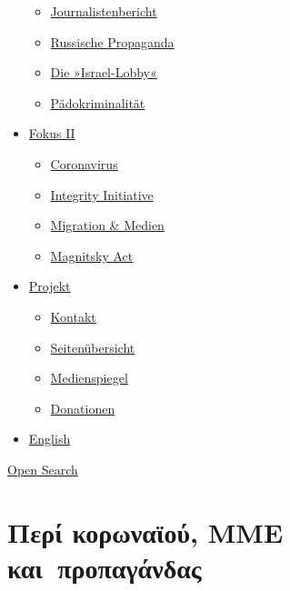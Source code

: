\begin{itemize}
  \begin{itemize}
  \tightlist
  \item
    \href{https://swprs.org/bericht-eines-journalisten/}{Journalistenbericht}
  \item
    \href{https://swprs.org/russische-propaganda/}{Russische Propaganda}
  \item
    \href{https://swprs.org/die-israel-lobby-fakten-und-mythen/}{Die
    »Israel-Lobby«}
  \item
    \href{https://swprs.org/geopolitik-und-paedokriminalitaet/}{Pädokriminalität}
  \end{itemize}
\item
  \href{https://swprs.org/migration-und-medien/}{Fokus II}

  \begin{itemize}
  \tightlist
  \item
    \href{https://swprs.org/covid-19-hinweis-ii/}{Coronavirus}
  \item
    \href{https://swprs.org/die-integrity-initiative/}{Integrity
    Initiative}
  \item
    \href{https://swprs.org/migration-und-medien/}{Migration \& Medien}
  \item
    \href{https://swprs.org/der-fall-magnitsky/}{Magnitsky Act}
  \end{itemize}
\item
  \href{https://swprs.org/kontakt/}{Projekt}

  \begin{itemize}
  \tightlist
  \item
    \href{https://swprs.org/kontakt/}{Kontakt}
  \item
    \href{https://swprs.org/uebersicht/}{Seitenübersicht}
  \item
    \href{https://swprs.org/medienspiegel/}{Medienspiegel}
  \item
    \href{https://swprs.org/donationen/}{Donationen}
  \end{itemize}
\item
  \href{https://swprs.org/contact/}{English}
\end{itemize}

\protect\hyperlink{}{Open Search}

\hypertarget{ux3c0ux3b5ux3c1ux3af-ux3baux3bfux3c1ux3c9ux3bdux3b1ux3caux3bfux3cd-ux3bcux3bcux3b5-ux3baux3b1ux3b9-ux3c0ux3c1ux3bfux3c0ux3b1ux3b3ux3acux3bdux3b4ux3b1ux3c2}{%
\section{Περί κορωναϊού, ΜΜΕ
και~προπαγάνδας}\label{ux3c0ux3b5ux3c1ux3af-ux3baux3bfux3c1ux3c9ux3bdux3b1ux3caux3bfux3cd-ux3bcux3bcux3b5-ux3baux3b1ux3b9-ux3c0ux3c1ux3bfux3c0ux3b1ux3b3ux3acux3bdux3b4ux3b1ux3c2}}

